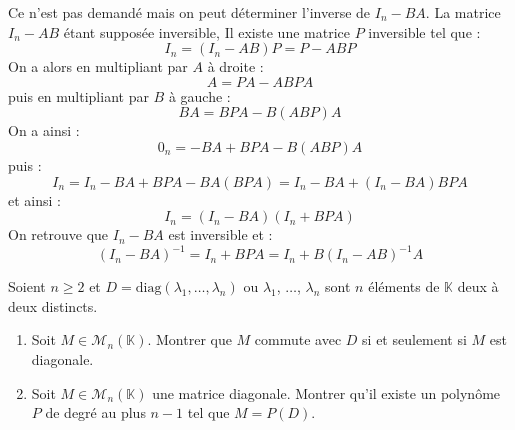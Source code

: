 \documentclass[a4paper,twoside,french,11pt]{VcCours}
\begin{document}
\noindent Ce n'est pas demandé mais on peut déterminer l'inverse de $I_n-BA$. La matrice $I_n-AB$ étant supposée inversible, Il existe une matrice $P$ inversible tel que :
$$ I_n= (I_n-AB)P = P- ABP$$
On a alors en multipliant par $A$ à droite : 
$$ A = P A - A B P A$$
puis en multipliant par $B$ à gauche :
$$ BA = BPA- B(ABP)A$$
On a ainsi :
$$ 0_n = -BA + BPA- B(ABP)A$$
puis :
$$ I_n = I_n - BA +BPA - BA(BPA) = I_n - BA + (I_n- BA) BPA$$
et ainsi :
$$ I_n = (I_n-BA)(I_n+BPA)$$
On retrouve que $I_n-BA$ est inversible et :
$$ (I_n-BA)^{-1} = I_n+BPA = I_n+B(I_n-AB)^{-1}A$$


\begin{Exercice}{} Soient $n \geq 2$ et $D= \textrm{diag}(\lambda_1, \ldots, \lambda_n)$ ou $\lambda_1$, $\ldots$, $\lambda_n$ sont $n$ éléments de $\mathbb{K}$ deux à deux distincts.
\begin{enumerate}
\item Soit $M \in \mathcal{M}_n(\mathbb{K})$. Montrer que $M$ commute avec $D$ si et seulement si $M$ est diagonale.
\item Soit $M \in \mathcal{M}_n(\mathbb{K})$ une matrice diagonale. Montrer qu'il existe un polynôme $P$ de degré au plus $n-1$ tel que $M=P(D)$.
\end{enumerate}
\end{Exercice}
\end{document}
